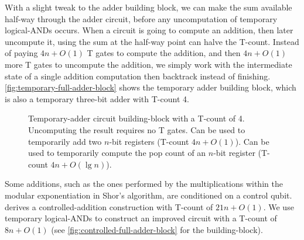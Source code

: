 \documentclass{quantumarticle-customized}
\begin{document}
With a slight tweak to the adder building block, we can make the sum available half-way through the adder circuit, before any uncomputation of temporary logical-ANDs occurs.
When a circuit is going to compute an addition, then later uncompute it, using the sum at the half-way point can halve the T-count.
Instead of paying $4n + O(1)$ T gates to compute the addition, and then $4n + O(1)$ more T gates to uncompute the addition, we simply work with the intermediate state of a single addition computation then backtrack instead of finishing.
\autoref{fig:temporary-full-adder-block} shows the temporary adder building block, which is also a temporary three-bit adder with T-count 4.

\begin{figure}
  \caption{
	Temporary-adder circuit building-block with a T-count of 4.
	Uncomputing the result requires no T gates.
	Can be used to temporarily add two $n$-bit registers (T-count $4n + O(1)$).
	Can be used to temporarily compute the pop count of an $n$-bit register (T-count $4n + O(\lg n)$).
  }
  \label{fig:temporary-full-adder-block}
\end{figure}

Some additions, such as the ones performed by the multiplications within the modular exponentiation in Shor's algorithm, are conditioned on a control qubit.
\citep{Coreas2017} derives a controlled-addition construction with T-count of $21n + O(1)$.
We use temporary logical-ANDs to construct an improved circuit with a T-count of $8n + O(1)$ (see \autoref{fig:controlled-full-adder-block} for the building-block).
\end{document}
